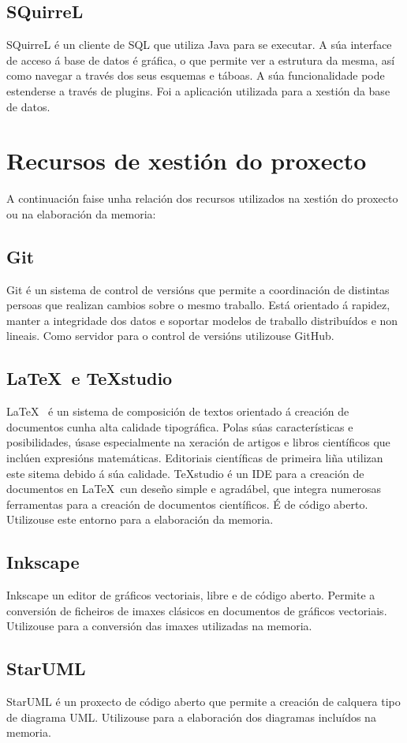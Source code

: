 \subsection{SQuirreL}
SQuirreL \cite{squirrel} é un cliente de SQL que utiliza Java para se executar. A súa interface de acceso á base de datos é gráfica, o que permite ver a estrutura da mesma, así como navegar a través dos seus esquemas e táboas. A súa funcionalidade pode estenderse a través de plugins. Foi a aplicación utilizada para a xestión da base de datos.


\section{Recursos de xestión do proxecto}
A continuación faise unha relación dos recursos utilizados na xestión do proxecto ou na elaboración da memoria:

\subsection{Git}
Git \cite{git} é un sistema de control de versións que permite a coordinación de distintas persoas que realizan cambios sobre o mesmo traballo. Está orientado á rapidez, manter a integridade dos datos e soportar modelos de traballo distribuídos e non lineais. Como servidor para o control de versións utilizouse GitHub.


\subsection{\LaTeX\ e TeXstudio}
\LaTeX\ \cite{latex} é un sistema de composición de textos orientado á creación de documentos cunha alta calidade tipográfica. Polas súas características e posibilidades, úsase especialmente na xeración de artigos e libros científicos que inclúen expresións matemáticas. Editoriais científicas de primeira liña utilizan este sitema debido á súa calidade.
TeXstudio \cite{texstudio} é un IDE para a creación de documentos en \LaTeX\, cun deseño simple e agradábel, que integra numerosas ferramentas para a creación de documentos científicos. É de código aberto. Utilizouse este entorno para a elaboración da memoria.


\subsection{Inkscape}
Inkscape \cite{inkscape} un editor de gráficos vectoriais, libre e de código aberto. Permite a conversión de ficheiros de imaxes clásicos en documentos de gráficos vectoriais. Utilizouse para a conversión das imaxes utilizadas na memoria.


\subsection{StarUML}
StarUML \cite{staruml} é un proxecto de código aberto que permite a creación de calquera tipo de diagrama UML. Utilizouse para a elaboración dos diagramas incluídos na memoria.
